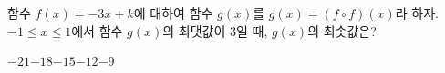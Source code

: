 함수 $f(x)=-3x+k$에 대하여 함수 $g(x)$를 $g(x)=(f\circ f)(x)$라 하자. $-1\le x\le 1$에서 함수 $g(x)$의 최댓값이 $3$일 때, $g(x)$의 최솟값은? 
\begin{choices32}{$-21$}{$-18$}{$-15$}{$-12$}{$-9$}\end{choices32}
